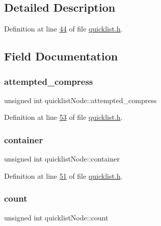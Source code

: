 \subsection{Detailed Description}


Definition at line \hyperlink{quicklist_8h_source_l00044}{44} of file \hyperlink{quicklist_8h_source}{quicklist.\+h}.



\subsection{Field Documentation}
\mbox{\label{structquicklistNode_a979d59af685663ec408f2591b76f0d02}} 
\subsubsection{\texorpdfstring{attempted\+\_\+compress}{attempted\_compress}}
{\footnotesize\ttfamily unsigned int quicklist\+Node\+::attempted\+\_\+compress}



Definition at line \hyperlink{quicklist_8h_source_l00053}{53} of file \hyperlink{quicklist_8h_source}{quicklist.\+h}.

\mbox{\label{structquicklistNode_aec7a11507fc9f43595094cd27077ccc8}} 
\subsubsection{\texorpdfstring{container}{container}}
{\footnotesize\ttfamily unsigned int quicklist\+Node\+::container}



Definition at line \hyperlink{quicklist_8h_source_l00051}{51} of file \hyperlink{quicklist_8h_source}{quicklist.\+h}.

\mbox{\label{structquicklistNode_a3fdaced8ae4a78106223abb6f3be3c62}} 
\subsubsection{\texorpdfstring{count}{count}}
{\footnotesize\ttfamily unsigned int quicklist\+Node\+::count}



